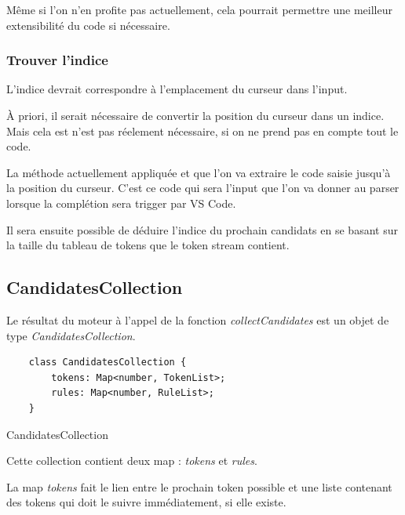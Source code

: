 \documentclass[
    iict, %
    il, %
]{heig-tb}
\begin{document}
Même si l'on n'en profite pas actuellement, cela pourrait permettre une meilleur extensibilité du code si nécessaire.


\subsubsection{Trouver l'indice}

L'indice devrait correspondre à l'emplacement du curseur dans l'input.

À priori, il serait nécessaire de convertir la position du curseur dans un indice.
Mais cela est n'est pas réelement nécessaire, si on ne prend pas en compte tout le code.

La méthode actuellement appliquée et que l'on va extraire le code saisie jusqu'à la position du curseur.
C'est ce code qui sera l'input que l'on va donner au parser lorsque la complétion sera trigger par VS Code.

Il sera ensuite possible de déduire l'indice du prochain candidats en se basant sur la taille du tableau de tokens que le token stream contient.


\subsection{CandidatesCollection}

Le résultat du moteur à l'appel de la fonction \emph{collectCandidates} est un objet de type \emph{CandidatesCollection}.

\begin{listing}[!ht]
    \begin{verbatim}
    class CandidatesCollection {
        tokens: Map<number, TokenList>;
        rules: Map<number, RuleList>;
    }
    \end{verbatim}
    \caption{CandidatesCollection}
    \label{CandidatesCollection}
\end{listing}

Cette collection contient deux map : \emph{tokens} et \emph{rules}.

La map \emph{tokens} fait le lien entre le prochain token possible et une liste contenant des tokens qui doit le suivre immédiatement, si elle existe.
\end{document}
